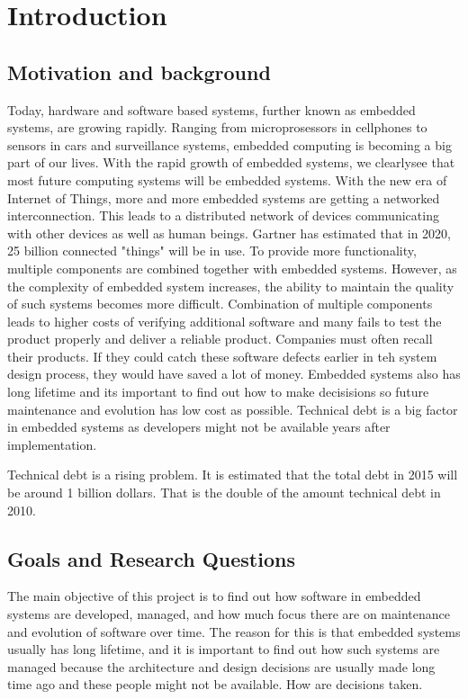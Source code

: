 \chapter{Introduction}

\section{Motivation and background}




Today, hardware and software based systems, further known as embedded systems, are growing rapidly. Ranging from microprosessors in cellphones to sensors in cars and surveillance systems, embedded computing is becoming a big part of our lives. With the rapid growth of embedded systems, we clearlysee that most future computing systems will be embedded systems\cite{wolfmadsen-2000}. With the new era of Internet of Things, more and more embedded systems are getting a networked interconnection. This leads to a distributed network of devices communicating with other devices as well as human beings. Gartner has estimated that in 2020, 25 billion connected "things" will be in use\cite{gartner}. To provide more functionality, multiple components are combined together with embedded systems. However, as the complexity of embedded system increases, the ability to maintain the quality of such systems becomes more difficult. Combination of multiple components leads to higher costs of verifying additional software and many fails to test the product properly and deliver a reliable product. Companies must often recall their products. If they could catch these software defects earlier in teh system design process, they would have saved a lot of money. Embedded systems also has long lifetime and its important to find out how to make decisisions so future maintenance and evolution has low cost as possible. Technical debt is a big factor in embedded systems as developers might not be available years after implementation.

Technical debt is a rising problem. It is estimated that the total debt in 2015 will be around 1 billion dollars. That is the double of the amount technical debt in 2010.


\section{Goals and Research Questions}
The main objective of this project is to find out how software in embedded systems are developed, managed, and how much focus there are on maintenance and evolution of software over time. The reason for this is that embedded systems usually has long lifetime, and it is important to find out how such systems are managed because the architecture and design decisions are usually made long time ago and these people might not be available. How are decisions taken.

